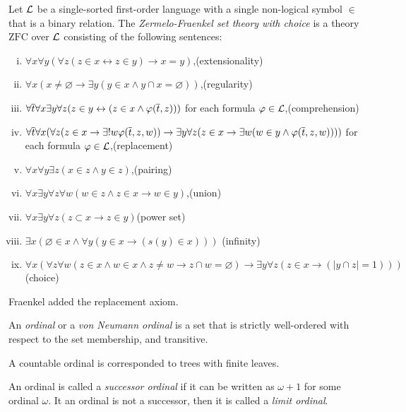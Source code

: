 \documentclass{../../large}
\begin{document}
\begin{prb}
Let $\mathcal{L}$ be a single-sorted first-order language with a single non-logical symbol $\in$ that is a binary relation.
The \emph{Zermelo-Fraenkel set theory with choice} is a theory $\mathrm{ZFC}$ over $\mathcal{L}$ consisting of the following sentences:
\begin{enumerate}[(i)]
\item $\forall x\forall y(\forall z(z\in x\leftrightarrow z\in y)\to x=y)$,\hfill(extensionality)
\item $\forall x(x\ne\varnothing\to\exists y(y\in x\wedge y\cap x=\varnothing))$,\hfill(regularity)
\item $\forall\overline t\forall x\exists y\forall z(z\in y\leftrightarrow(z\in x\wedge\varphi(\overline t,z)))$ for each formula $\varphi\in\mathcal{L}$,\hfill(comprehension)
\item $\forall\overline t\forall x(\forall z(z\in x\to\exists!w\varphi(\overline t,z,w))\to\exists y\forall z(z\in x\to\exists w(w\in y\wedge\varphi(\overline t,z,w))))$ for each formula $\varphi\in\mathcal{L}$,\hfill(replacement)
\item $\forall x\forall y\exists z(x\in z\wedge y\in z)$,\hfill(pairing)
\item $\forall x\exists y\forall z\forall w(w\in z\wedge z\in x\to w\in y)$,\hfill(union)
\item $\forall x\exists y\forall z(z\subset x\to z\in y)$\hfill(power set)
\item $\exists x(\varnothing\in x\wedge\forall y(y\in x\to(s(y)\in x)))$ \hfill(infinity)
\item $\forall x(\forall z\forall w(z\in x\wedge w\in x\wedge z\ne w\to z\cap w=\varnothing)\to\exists y\forall z(z\in x\to(|y\cap z|=1)))$ \hfill(choice)
\end{enumerate}

Fraenkel added the replacement axiom.

\end{prb}

\begin{prb}[Classes]

\end{prb}


\begin{prb}[]
An \emph{ordinal} or a \emph{von Neumann ordinal} is a set that is strictly well-ordered  with respect to the set membership, and transitive.

A countable ordinal is corresponded to trees with finite leaves.

An ordinal is called a \emph{successor ordinal} if it can be written as $\omega+1$ for some ordinal $\omega$.
It an ordinal is not a successor, then it is called a \emph{limit ordinal}.
\end{prb}
\end{document}
